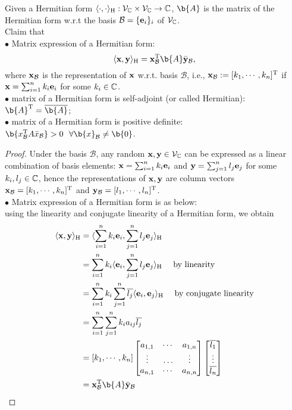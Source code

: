 \begin{theorem}
\label{thm:matrix_of_Hermitian_form}
Given a Hermitian form $\langle \cdot, \cdot \rangle_\text{H}: \mathcal{V}_{\mathbb{C}} \times \mathcal{V}_{\mathbb{C}} \to \mathbb{C}$, $\b{A}$ is the matrix of the Hermitian form w.r.t the basis $\mathcal{B}= \{\mathbf{e}_i\}_{i}$ of $\mathcal{V}_{\mathbb{C}}$.\\
Claim that\\
$\bullet$ Matrix expression of a Hermitian form:
\begin{equation}
\label{eqn:matrix_of_Hermitian_form}
 \langle \x, \y \rangle_\text{H} = \x^\T_{\mathcal{B}} \b{A} \bar{\y}_{\mathcal{B}},
\end{equation}
where $\mathbf{x}_{\mathcal{B}}$ is the representation of $\mathbf{x}$ w.r.t. basis $\mathcal{B}$, i.e., $\mathbf{x}_{\mathcal{B}} := [k_1, \cdots, k_n]^{\mathrm{T}}$ if $\mathbf{x} = \sum_{i=1}^n k_i \mathbf{e}_i$ for some $k_i \in \mathbb{C}$.\\
$\bullet$ matrix of a Hermitian form is self-adjoint (or called Hermitian): $\b{A}^\T = \overline{\b{A}}$;\\
$\bullet$ matrix of a Hermitian form is positive definite: $\b{x_\mathcal{B}^\T A \bar{x}_\mathcal{B}} > 0 ~\ \forall \b{x}_\mathcal{B} \neq \b{0}$.

\begin{proof}
Under the basis $\mathcal{B}$, any random $\mathbf{x}, \mathbf{y} \in \mathcal{V}_{\mathbb{C}}$ can be expressed as a linear combination of basis elements: $\mathbf{x} = \sum_{i=1}^n k_i \mathbf{e}_i$ and $\mathbf{y} = \sum_{j=1}^n l_j \mathbf{e}_j$ for some $k_i, l_j \in \mathbb{C}$, hence the representations of $\mathbf{x}, \mathbf{y}$ are column vectors $\mathbf{x}_{\mathcal{B}} = [k_1, \cdots, k_n]^{\mathrm{T}}$ and $\mathbf{y}_{\mathcal{B}} = [l_1, \cdots, l_n]^{\mathrm{T}}$.\\
$\bullet$ Matrix expression of a Hermitian form is as below:\\
using the linearity and conjugate linearity of a Hermitian form, we obtain
\begin{align*}
   \langle \x, \y \rangle_\text{H} &= \langle \sum_{i=1}^n k_i \e_i, \sum_{j=1}^n l_j \e_j \rangle_\text{H}\\
   &= \sum_{i=1}^n k_i \langle \e_i, \sum_{j=1}^n l_j \e_j \rangle_\text{H} ~\ ~\ \textnormal{by linearity}\\
   &= \sum_{i=1}^n k_i \sum_{j=1}^n \overline{l_j} \langle \e_i, \e_j \rangle_\text{H} ~\ ~\ \textnormal{by conjugate linearity}\\
   &= \sum_{i=1}^n \sum_{j=1}^n  k_i  a_{ij} \overline{l_j} \\
   &= [k_1, \cdots, k_n] 
   \begin{bmatrix}
    a_{1,1} &\cdots &a_{1,n}\\
    \vdots  &\ldots &\vdots\\
    a_{n,1} &\cdots &a_{n,n}
   \end{bmatrix}
   \begin{bmatrix}
   \overline{l_1}\\
   \vdots\\
   \overline{l_n}
   \end{bmatrix}\\
   &= \x^\T_{\mathcal{B}} \b{A} \bar{\y}_{\mathcal{B}}
\end{align*}


\end{proof}
\end{theorem}
